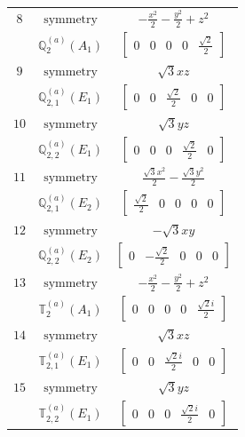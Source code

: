 \documentclass[fleqn,8pt,landscape]{jsarticle}
\begin{document}
\begin{longtable}{ccc}
$ 8 $ & $ \text{symmetry} $ & $ - \frac{x^{2}}{2} - \frac{y^{2}}{2} + z^{2} $ \\
$  $ & $ \mathbb{Q}_{2}^{(a)}(A_{1}) $ & $ \begin{bmatrix} 0 & 0 & 0 & 0 & \frac{\sqrt{2}}{2} \end{bmatrix} $ \\ \hline
$ 9 $ & $ \text{symmetry} $ & $ \sqrt{3} x z $ \\
$  $ & $ \mathbb{Q}_{2,1}^{(a)}(E_{1}) $ & $ \begin{bmatrix} 0 & 0 & \frac{\sqrt{2}}{2} & 0 & 0 \end{bmatrix} $ \\ \hline
$ 10 $ & $ \text{symmetry} $ & $ \sqrt{3} y z $ \\
$  $ & $ \mathbb{Q}_{2,2}^{(a)}(E_{1}) $ & $ \begin{bmatrix} 0 & 0 & 0 & \frac{\sqrt{2}}{2} & 0 \end{bmatrix} $ \\ \hline
$ 11 $ & $ \text{symmetry} $ & $ \frac{\sqrt{3} x^{2}}{2} - \frac{\sqrt{3} y^{2}}{2} $ \\
$  $ & $ \mathbb{Q}_{2,1}^{(a)}(E_{2}) $ & $ \begin{bmatrix} \frac{\sqrt{2}}{2} & 0 & 0 & 0 & 0 \end{bmatrix} $ \\ \hline
$ 12 $ & $ \text{symmetry} $ & $ - \sqrt{3} x y $ \\
$  $ & $ \mathbb{Q}_{2,2}^{(a)}(E_{2}) $ & $ \begin{bmatrix} 0 & - \frac{\sqrt{2}}{2} & 0 & 0 & 0 \end{bmatrix} $ \\ \hline
$ 13 $ & $ \text{symmetry} $ & $ - \frac{x^{2}}{2} - \frac{y^{2}}{2} + z^{2} $ \\
$  $ & $ \mathbb{T}_{2}^{(a)}(A_{1}) $ & $ \begin{bmatrix} 0 & 0 & 0 & 0 & \frac{\sqrt{2} i}{2} \end{bmatrix} $ \\ \hline
$ 14 $ & $ \text{symmetry} $ & $ \sqrt{3} x z $ \\
$  $ & $ \mathbb{T}_{2,1}^{(a)}(E_{1}) $ & $ \begin{bmatrix} 0 & 0 & \frac{\sqrt{2} i}{2} & 0 & 0 \end{bmatrix} $ \\ \hline
$ 15 $ & $ \text{symmetry} $ & $ \sqrt{3} y z $ \\
$  $ & $ \mathbb{T}_{2,2}^{(a)}(E_{1}) $ & $ \begin{bmatrix} 0 & 0 & 0 & \frac{\sqrt{2} i}{2} & 0 \end{bmatrix} $ \\ \hline

\end{longtable}
\end{document}
